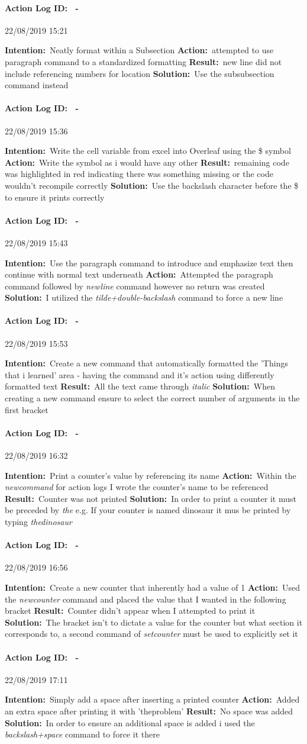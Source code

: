 \documentclass[12pt]{article}
\newcounter{problem} \setcounter{problem}{1}
\newcommand{\actionlog}[1]{\paragraph{Action Log ID: \theproblem\ -}{#1} ~\\ \addtocounter{problem}{1}}
\newcommand{\intention}[1]{\textbf{Intention:}{\textnormal\ #1} \newline}
\newcommand{\action}[1]{\textbf{Action:}{\textnormal\ #1} \newline}
\newcommand{\result}[1]{\textbf{Result:}{\textnormal\ #1} \newline}
\newcommand{\solution}[1]{\textbf{Solution:}{\textnormal\ #1} \newline}
\begin{document}
\actionlog{22/08/2019 15:21}
\intention{Neatly format within a Subsection}
\action{attempted to use paragraph command to a standardized formatting}
\result{new line did not include referencing numbers for location}
\solution{Use the subsubsection command instead}

\actionlog{22/08/2019 15:36}
\intention{Write the cell variable from excel into Overleaf using the \$ symbol}
\action{Write the symbol as i would have any other}
\result{remaining code was highlighted in red indicating there was something missing or the code wouldn't recompile correctly}
\solution{Use the backslash character before the \$ to ensure it prints correctly}

\actionlog{22/08/2019 15:43}
\intention{Use the paragraph command to introduce and emphasize text then continue with normal text underneath}
\action{Attempted the paragraph command followed by \textit{newline} command however no return was created}
\solution{I utilized the \textit{tilde+double-backslash} command to force a new line}

\actionlog{22/08/2019 15:53}
\intention{Create a new command that automatically formatted the 'Things that i learned' area - having the command and it's action using differently formatted text}
\result{All the text came through \textit{italic}}
\solution{When creating a new command ensure to select the correct number of arguments in the first bracket}

\actionlog{22/08/2019 16:32}
\intention{Print a counter's value by referencing its name}
\action{Within the \textit{newcommand} for action logs I wrote the counter's name to be referenced}
\result{Counter was not printed}
\solution{In order to print a counter it must be preceded by \textit{the} e.g. If your counter is named dinosaur it mus be printed by typing \textit{thedinosaur}}

\actionlog{22/08/2019 16:56}
\intention{Create a new counter that inherently had a value of 1}
\action{Used the \textit{newcounter} command and placed the value that I wanted in the following bracket}
\result{Counter didn't appear when I attempted to print it}
\solution{The bracket isn't to dictate a value for the counter but what section it corresponds to, a second command of \textit{setcounter} must be used to explicitly set it}

\actionlog{22/08/2019 17:11}
\intention{Simply add a space after inserting a printed counter}
\action{Added an extra space after printing it with 'theproblem'}
\result{No space was added}
\solution{In order to ensure an additional space is added i used the \textit{backslash+space} command to force it there}
\end{document}
